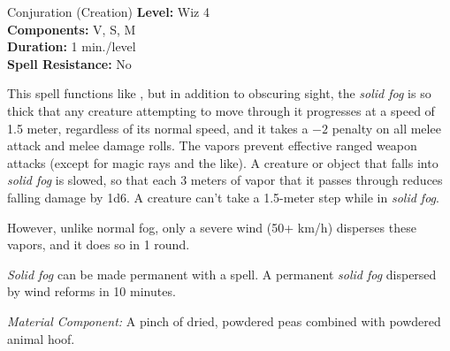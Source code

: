 {Conjuration (Creation)}
{
	\textbf{Level:}
	Wiz 4\\
	\textbf{Components:}
	V, S, M\\
	\textbf{Duration:}
	1 min./level\\
	\textbf{Spell Resistance:}
	No\\
}
{
	This spell functions like , but in addition to obscuring sight, the \emph{solid fog} is so thick that any creature attempting to move through it progresses at a speed of 1.5 meter, regardless of its normal speed, and it takes a $-2$ penalty on all melee attack and melee damage rolls. The vapors prevent effective ranged weapon attacks (except for magic rays and the like). A creature or object that falls into \emph{solid fog} is slowed, so that each 3 meters of vapor that it passes through reduces falling damage by 1d6. A creature can't take a 1.5-meter step while in \emph{solid fog}.

	However, unlike normal fog, only a severe wind (50+ km/h) disperses these vapors, and it does so in 1 round.

	\emph{Solid fog} can be made permanent with a  spell. A permanent \emph{solid fog} dispersed by wind reforms in 10 minutes.

	\textit{Material Component:}
	A pinch of dried, powdered peas combined with powdered animal hoof.

}
